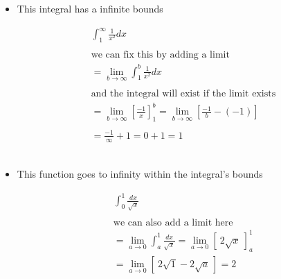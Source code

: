 \documentclass{article}
\begin{document}
\begin{itemize}

\item
This integral has a infinite bounds

\begin{gather*}
\int_1^{\infty} \frac{1}{x^2} dx
\\
\\
\text{we can fix this by adding a limit}
\\
=\lim_{b \to \infty} \int_1^b \frac{1}{x^2} dx
\\
\\
\text{and the integral will exist if the limit exists}
\\
=\lim_{b \to \infty} \left[ \frac{-1}{x} \right]_1^b
=\lim_{b \to \infty} \left[ \frac{-1}{b} - (-1) \right]
\\
\\
=\frac{-1}{\infty}+1
=0+1
=1
\end{gather*}
\\

\item
This function goes to infinity within the integral's bounds

\begin{gather*}
\int_0^1 \frac{dx}{\sqrt{x}}
\\
\\
\text{we can also add a limit here}
\\
=\lim_{a \to 0} \int_a^1 \frac{dx}{\sqrt{x}}
=\lim_{a \to 0} \left[ ~ 2\sqrt{x} ~ \right]_a^1
\\
=\lim_{a \to 0} \left[ ~ 2\sqrt{1} - 2\sqrt{a} ~ \right]
=2
\end{gather*}

\end{itemize}

\newpage
\end{document}
